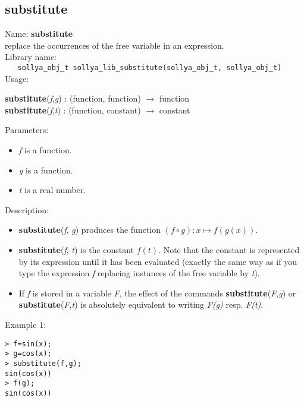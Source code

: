 \subsection{substitute}
\label{labsubstitute}
\noindent Name: \textbf{substitute}\\
\phantom{aaa}replace the occurrences of the free variable in an expression.\\[0.2cm]
\noindent Library name:\\
\verb|   sollya_obj_t sollya_lib_substitute(sollya_obj_t, sollya_obj_t)|\\[0.2cm]
\noindent Usage: 
\begin{center}
\textbf{substitute}(\emph{f},\emph{g}) : (\textsf{function}, \textsf{function}) $\rightarrow$ \textsf{function}\\
\textbf{substitute}(\emph{f},\emph{t}) : (\textsf{function}, \textsf{constant}) $\rightarrow$ \textsf{constant}\\
\end{center}
Parameters: 
\begin{itemize}
\item \emph{f} is a function.
\item \emph{g} is a function.
\item \emph{t} is a real number.
\end{itemize}
\noindent Description: \begin{itemize}

\item \textbf{substitute}(\emph{f}, \emph{g}) produces the function $(f \circ g) : x \mapsto f(g(x))$.

\item \textbf{substitute}(\emph{f}, \emph{t}) is the constant $f(t)$. Note that the constant is
   represented by its expression until it has been evaluated (exactly the same
   way as if you type the expression \emph{f} replacing instances of the free variable 
   by \emph{t}).

\item If \emph{f} is stored in a variable \emph{F}, the effect of the commands \textbf{substitute}(\emph{F},\emph{g}) or \textbf{substitute}(\emph{F},\emph{t}) is absolutely equivalent to 
   writing \emph{F(g)} resp. \emph{F(t)}.
\end{itemize}
\noindent Example 1: 
\begin{center}\begin{minipage}{15cm}\begin{Verbatim}[frame=single]
> f=sin(x);
> g=cos(x);
> substitute(f,g);
sin(cos(x))
> f(g);
sin(cos(x))
\end{Verbatim}
\end{minipage}\end{center}
